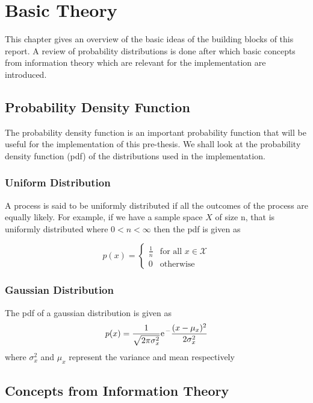 \chapter{Basic Theory}
This chapter gives an overview of the basic ideas of the building blocks of this report. A review of probability distributions is done after which basic concepts from information theory which are relevant for the implementation are introduced.

\section{Probability Density Function}
The probability density function is an important probability function that will be useful for the implementation of this pre-thesis. We shall look at the probability density function (pdf) of the distributions used in the implementation.

\subsection{Uniform Distribution}
A process is said to be uniformly distributed if all the outcomes of the process are equally likely. For example, if we have a sample space $X$ of size n, that is uniformly distributed where \(0 < n  < \infty \) then the pdf is given as

\begin{equation}
p(x) =  \begin{cases} \frac{1}{n}  & \text{for all }  x \in  \mathcal{X}  \\  0 & \text{otherwise}\end{cases}
\end{equation}

\subsection{Gaussian Distribution}
The pdf of a gaussian distribution is given as 
\begin{equation}
p(x) = \frac{1}{\sqrt{2\pi\sigma_x^2}} \e^-\frac{(x-\mu_x)^2}{2\sigma_x^2}
\end{equation}
where $\sigma_x^2$ and $\mu_x$ represent the variance and mean respectively
\section{Concepts from Information Theory}
